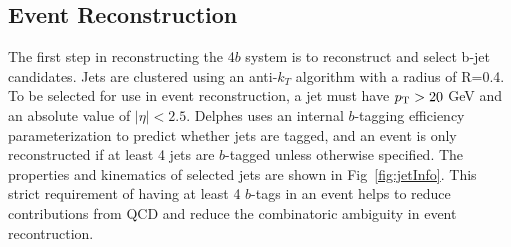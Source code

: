 \subsection{Event Reconstruction}
\label{sec:eventReco}
The first step in reconstructing the 4$b$ system is to reconstruct and select b-jet candidates. Jets are clustered using an anti-$k_T$ algorithm with a radius of R=0.4. To be selected for use in event reconstruction, a jet must have $p_{\text{T}} > 20$ GeV and an absolute value of $\mid\eta\mid < 2.5$. Delphes uses an internal $b$-tagging efficiency parameterization to predict whether jets are tagged, and an event is only reconstructed if at least 4 jets are $b$-tagged unless otherwise specified. The properties and kinematics of selected jets are shown in Fig~\ref{fig:jetInfo}. This strict requirement of having at least 4 $b$-tags in an event helps to reduce contributions from QCD and reduce the combinatoric ambiguity in event recontruction.

